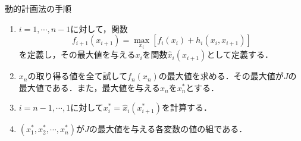 \documentclass[a5paper]{jarticle}
\begin{document}
\begin{itembox}[l]{動的計画法の手順}
\begin{enumerate}
   \item $i = 1, \cdots, n - 1$に対して，関数
   \[
   f_{i + 1}(x_{i + 1}) = \max_{x_i}[f_i(x_i) + h_i(x_i, x_{i + 1})]
   \]
   を定義し，その最大値を与える$x_i$を関数$\hat x_i(x_{i + 1})$として定義する．
   \item $x_n$の取り得る値を全て試して$f_n(x_n)$の最大値を求める．その最大値が$J$の最大値である．また，最大値を与える$x_n$を$x_n^*$とする．
   \item $i = n - 1, \cdots, 1$に対して$x_i^* = \hat x_i(x_{i + 1}^*)$を計算する．
   \item $(x_1^*, x_2^*, \cdots, x_n^*)$が$J$の最大値を与える各変数の値の組である．
\end{enumerate}
\end{itembox}
\end{document}
